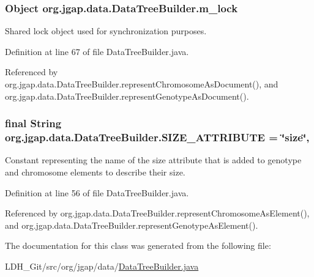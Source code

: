 \hypertarget{classorg_1_1jgap_1_1data_1_1_data_tree_builder_a219127f0652185c804595fe5231565d4}{
\subsubsection[{m\-\_\-lock}]{\setlength{\rightskip}{0pt plus 5cm}Object org.\-jgap.\-data.\-Data\-Tree\-Builder.\-m\-\_\-lock\hspace{0.3cm}{\ttfamily [private]}}}\label{classorg_1_1jgap_1_1data_1_1_data_tree_builder_a219127f0652185c804595fe5231565d4}
Shared lock object used for synchronization purposes. 

Definition at line 67 of file Data\-Tree\-Builder.\-java.



Referenced by org.\-jgap.\-data.\-Data\-Tree\-Builder.\-represent\-Chromosome\-As\-Document(), and org.\-jgap.\-data.\-Data\-Tree\-Builder.\-represent\-Genotype\-As\-Document().

\hypertarget{classorg_1_1jgap_1_1data_1_1_data_tree_builder_a70642e3964a539a1dc0b556449d47c7f}{
\subsubsection[{S\-I\-Z\-E\-\_\-\-A\-T\-T\-R\-I\-B\-U\-T\-E}]{\setlength{\rightskip}{0pt plus 5cm}final String org.\-jgap.\-data.\-Data\-Tree\-Builder.\-S\-I\-Z\-E\-\_\-\-A\-T\-T\-R\-I\-B\-U\-T\-E = \char`\"{}size\char`\"{}\hspace{0.3cm}{\ttfamily [static]}, {\ttfamily [private]}}}\label{classorg_1_1jgap_1_1data_1_1_data_tree_builder_a70642e3964a539a1dc0b556449d47c7f}
Constant representing the name of the size attribute that is added to genotype and chromosome elements to describe their size. 

Definition at line 56 of file Data\-Tree\-Builder.\-java.



Referenced by org.\-jgap.\-data.\-Data\-Tree\-Builder.\-represent\-Chromosome\-As\-Element(), and org.\-jgap.\-data.\-Data\-Tree\-Builder.\-represent\-Genotype\-As\-Element().



The documentation for this class was generated from the following file\-:\begin{DoxyCompactItemize}
\item 
L\-D\-H\-\_\-\-Git/src/org/jgap/data/\hyperlink{_data_tree_builder_8java}{Data\-Tree\-Builder.\-java}\end{DoxyCompactItemize}

